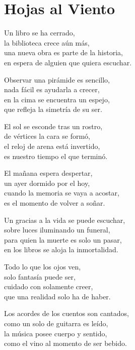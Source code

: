 \section*{Hojas al Viento}
\label{HojasViento}

\vspace{1em}
\begin{center}
Un libro se ha cerrado,\\ 
la biblioteca crece aún más,\\ 
una nueva obra es parte de la historia,\\ 
en espera de alguien que quiera escuchar.

\vspace{1em} 
Observar una pirámide es sencillo,\\ 
nada fácil es ayudarla a crecer,\\ 
en la cima se encuentra un espejo,\\ 
que refleja la simetría de su ser.

\vspace{1em} 
El sol se esconde tras un rostro,\\ 
de vértices la cara se formó,\\ 
el reloj de arena está invertido,\\ 
es nuestro tiempo el que terminó.

\vspace{1em} 
El mañana espera despertar,\\ 
un ayer dormido por el hoy,\\ 
cuando la memoria se vaya a acostar,\\ 
es el momento de volver a soñar.

\vspace{1em} 
Un gracias a la vida se puede escuchar,\\ 
sobre luces iluminando un funeral,\\ 
para quien la muerte es solo un pasar,\\ 
en los libros se aloja la inmortalidad.

\vspace{1em} 
Todo lo que los ojos ven,\\ 
solo fantasía puede ser,\\ 
cuidado con solamente creer,\\ 
que una realidad solo ha de haber.

\vspace{1em} 
Los acordes de los cuentos son cantados,\\ 
como un solo de guitarra es leído,\\ 
la música posee cuerpo y sentido,\\ 
como el vino al momento de ser bebido.


\end{center}

